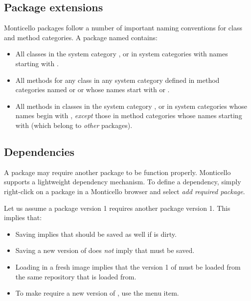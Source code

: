 \documentclass[a4paper,10pt,twoside]{book}
\begin{document}
\subsection{Package extensions}
Monticello packages follow a number of important naming conventions for class and method categories.
A package named  contains:

\begin{itemize}
\item All classes in the system category , or in system categories with names starting with .
\item All methods for any class in any system category defined in method categories named  or  or whose names start with  or .
\item All methods in classes in the system category , or in system categories whose names begin with , \emph{except} those in method categories whose names starting with \prot{*} (\ie which belong to \emph{other} packages).
\end{itemize}

\subsection{Dependencies}

A package may require another package to be function properly. Monticello supports a lightweight dependency mechanism. To define a dependency, simply right-click on a package in a Monticello browser and select \emph{add required package}.

Let us assume a package  version 1 requires another package  version 1. This implies that:

\begin{itemize}
\item Saving  implies that  should be saved as well if  is dirty.
\item Saving a new version of  does \emph{not} imply that  must be saved.
\item Loading  in a fresh image implies that the version 1 of  must be loaded from the same repository that  is loaded from.
\item To make  require a new version of , use the  menu item.
\end{itemize}
\end{document}
